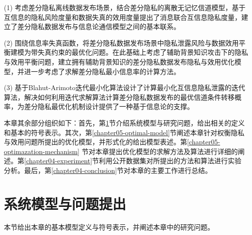 (1) 考虑差分隐私离线数据发布场景，结合差分隐私的离散无记忆信道模型，基于互信息的隐私风险度量和数据失真的效用度量提出了消息联合互信息隐私度量，建立了差分隐私数据发布与信息论通信模型之间的基本联系。

(2) 围绕信息率失真函数，将差分隐私数据发布场景中隐私泄露风险与数据效用平衡建模为带失真约束的最优化问题。在此基础上考虑了辅助背景知识攻击下的隐私与效用平衡问题，建立拥有辅助背景知识的差分隐私数据发布隐私与效用优化模型，并进一步考虑了求解差分隐私最小信息率的计算方法。

(3) 基于Blahut-Arimoto迭代最小化算法设计了计算最小化互信息隐私泄露的迭代算法，解决如何利用迭代求解算法计算差分隐私数据发布的最优信道条件转移概率，为差分隐私最优化机制设计提供了一种基于信息论的支撑。

%
%

本章其余部分组织如下：首先，第\ref{chapter05-system-model}节介绍系统模型与研究问题，给出相关的定义和基本的符号表示。其次，第\ref{chapter05-optimal-model}节阐述本章针对权衡隐私与效用问题所提出的优化模型，并形式化的给出模型表述。第\ref{chapter05-optimazation-mechanism} 节对本章提出优化模型的求解方法及算法进行详细的阐述。第\ref{chapter04-experiment}节利用公开数据集对所提出的方法和算法进行实验分析。最后，第\ref{chapter04-conclusion}节对本章的主要工作进行总结。

\section{系统模型与问题提出}\label{chapter05-system-model}


本节给出本章的基本模型定义与符号表示，并阐述本章中的研究问题。


